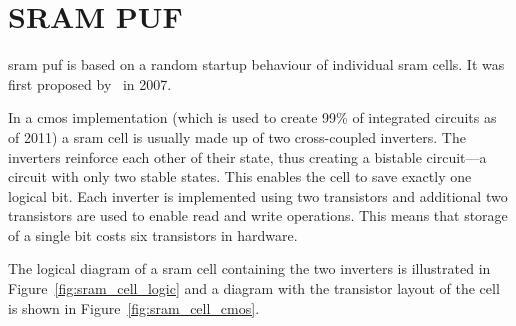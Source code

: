 \chapter{SRAM PUF}\label{sec:sram_puf}

\gls{sram} \gls{puf} is based on a random startup behaviour of individual \gls{sram} cells. It was first proposed by~\cite{Guajardo2007} in 2007.

In a \gls{cmos} implementation (which is used to create 99\% of integrated circuits as of 2011\cite{Voinigescu2013}) a \gls{sram} cell is usually made up of two cross-coupled inverters. The inverters reinforce each other of their state, thus creating a bistable circuit---a circuit with only two stable states. This enables the cell to save exactly one logical bit. Each inverter is implemented using two transistors and additional two transistors are used to enable read and write operations. This means that storage of a single bit costs six transistors in hardware.\cite{Maes2010}

The logical diagram of a \gls{sram} cell containing the two inverters is illustrated in Figure~\ref{fig:sram_cell_logic} and a diagram with the transistor layout of the cell is shown in Figure~\ref{fig:sram_cell_cmos}.

